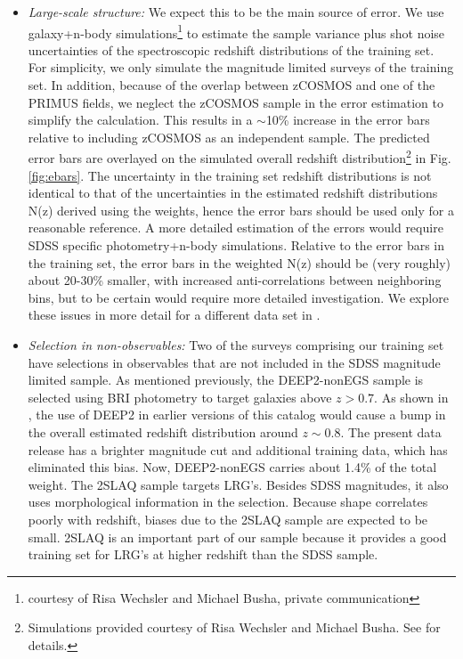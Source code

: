 \documentclass[preprint]{aastex}
\begin{document}
\begin{itemize}

\item {\it Large-scale structure:} We expect this to be the main source of
error.  We use galaxy+n-body simulations\footnote{courtesy of Risa Wechsler and
Michael Busha, private communication} to estimate the sample variance plus shot
noise uncertainties of the spectroscopic redshift distributions of the training
set.  For simplicity, we only simulate the magnitude limited surveys of the
training set.  In addition, because of the overlap between zCOSMOS and one of
the PRIMUS fields, we neglect the zCOSMOS sample in the error estimation to
simplify the calculation.  This results in a $\sim$10\% increase in the error
bars relative to including zCOSMOS as an independent sample.  The predicted
error bars are overlayed on the simulated overall redshift distribution\footnote{Simulations provided courtesy of Risa Wechsler and Michael Busha. See \cite{bushasimulations} for details.} in Fig.
\ref{fig:ebars}.  The uncertainty in the training set redshift distributions is
not identical to that of the uncertainties in the estimated redshift
distributions N(z) derived using the weights, hence the error bars should be
used only for a reasonable reference.  A more detailed estimation of the errors
would require SDSS specific photometry+n-body simulations.  Relative to the
error bars in the training set, the error bars in the weighted N(z) should be (very roughly) about
20-30\% smaller, with increased anti-correlations between neighboring bins, 
but to be certain would require more detailed investigation.  %
We explore these issues in more detail for a different data set in \citet{CunhaPhotozLSS11}.

\item {\it Selection in non-observables:} Two of the surveys comprising our
training set have selections in observables that are not included in the SDSS
magnitude limited sample.  As mentioned previously, the DEEP2-nonEGS sample is
selected using BRI photometry to target galaxies above $z>0.7$.  As shown in
\citet{CunhaPhotoz09}, the use of DEEP2 in earlier versions of this catalog
would cause a bump in the overall estimated redshift distribution around $z\sim
0.8$.  The present data release has a brighter magnitude cut and additional
training data, which has eliminated this bias.  
Now, DEEP2-nonEGS carries about 1.4\% of the total weight.  The 2SLAQ sample targets
LRG's.  Besides SDSS magnitudes, it also uses morphological information in the
selection.  Because shape correlates poorly with redshift, biases due to the
2SLAQ sample are expected to be small.  2SLAQ is an important part of our
sample because it provides a good training set for LRG's at higher redshift
than the SDSS sample.


\end{itemize}
\end{document}
